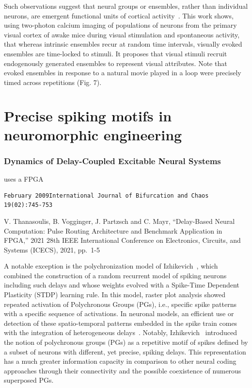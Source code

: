 \documentclass[brainsci, %
               review,submit,pdftex,moreauthors%
               ]{Definitions/mdpi}
\begin{document}
Such observations suggest that neural groups or ensembles, rather than individual neurons, are emergent functional units of cortical activity~\citep{miller_visual_2014}. This work shows, using two-photon calcium imaging of populations of neurons from the primary visual cortex of awake mice during visual stimulation and spontaneous activity, that whereas intrinsic ensembles recur at random time intervals, visually evoked ensembles are time-locked to stimuli. It proposes that visual stimuli recruit endogenously generated ensembles to represent visual attributes. Note that evoked ensembles in response to a natural movie played in a loop were precisely timed across repetitions (Fig. 7).
\section{Precise spiking motifs in  neuromorphic engineering}


\subsubsection{Dynamics of Delay-Coupled Excitable Neural Systems}
uses a FPGA
~\citep{dahlem_dynamics_2009}

\begin{verbatim}
February 2009International Journal of Bifurcation and Chaos 19(02):745-753
\end{verbatim}

V. Thanasoulis, B. Vogginger, J. Partzsch and C. Mayr, ``Delay-Based Neural Computation: Pulse Routing Architecture and Benchmark Application in FPGA,'' 2021 28th IEEE International Conference on Electronics, Circuits, and Systems (ICECS), 2021, pp.~1-5
~\citep{thanasoulis_delay-based_2021}


A notable exception is the polychronization model of Izhikevich~\citep{izhikevich_polychronization_2006}, which combined the construction of a random recurrent model of spiking neurons including such delays and whose weights evolved with a Spike-Time Dependent Plasticity (STDP) learning rule. In this model, raster plot analysis showed repeated activation of Polychronous Groups (PGs), i.e., specific spike patterns with a specific sequence of activations. In neuronal models, an efficient use or detection of these spatio-temporal patterns embedded in the spike train comes with the integration of heterogeneous delays~\citep{guise_bayesian_2014,zhang_supervised_2020}. Notably, Izhikevich~\citep{izhikevich_polychronization_2006} introduced the notion of polychronous groups (PGs) as a repetitive motif of spikes defined by a subset of neurons with different, yet precise, spiking delays. This representation has a much greater information capacity in comparison to other neural coding approaches through their connectivity and the possible coexistence of numerous superposed PGs.
\end{document}
